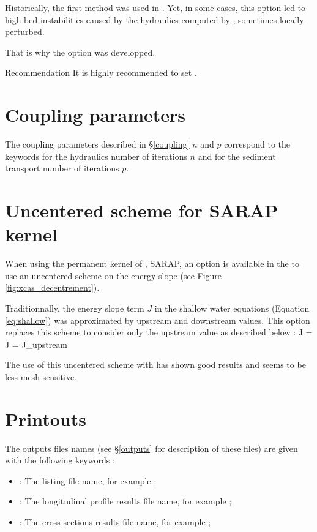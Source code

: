 Historically, the first method was used in \courlis. Yet, in some cases, this option led to high bed instabilities caused by the hydraulics computed by \mascaret, sometimes locally perturbed.

That is why the option  was developped.

\begin{WarningBlock}{Recommendation}
	It is highly recommended to set .
\end{WarningBlock}

\section{Coupling parameters}\label{coupling_param}

The coupling parameters described in \S \ref{coupling} $n$ and $p$ correspond to the keywords  for the hydraulics number of iterations $n$ and  for the sediment transport number of iterations $p$.

\section{Uncentered scheme for SARAP kernel}\label{uncentered}
When using the permanent kernel of \mascaret, SARAP, an option is available in the \xcas to use an uncentered scheme on the energy slope (see Figure \ref{fig:xcas_decentrement}).

Traditionnally, the energy slope term $J$ in the shallow water equations (Equation \ref{eq:shallow}) was approximated by upstream and downstream values.
This option replaces this scheme to consider only the upstream value as described below :
\bequ
	    J =  \rightarrow J = J_{upstream}
\eequ

The use of this uncentered scheme with \Cbedload has shown good results and seems to be less mesh-sensitive.

\section{Printouts}\label{printouts}

The outputs files names (see \S \ref{outputs} for description of these files) are given with the following keywords :

\begin{itemize}
	\item {} : The listing file name, for example  ;
	\item {} : The longitudinal profile results file name, for example  ;
	\item {} : The cross-sections results file name, for example  ;
\end{itemize}

